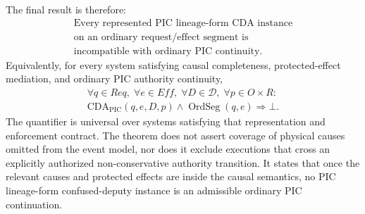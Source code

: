 \documentclass[10pt,twocolumn]{article}
\newcommand{\OrdSeg}{\operatorname{OrdSeg}}
\newcommand{\CDApic}{\mathrm{CDA}_{\mathrm{PIC}}}
\begin{document}
The final result is therefore:
\begin{equation}
\boxed{
\begin{gathered}
\text{Every represented PIC lineage-form CDA instance}\\
\text{on an ordinary request/effect segment is}\\
\text{incompatible with ordinary PIC continuity.}
\end{gathered}}
\end{equation}
Equivalently, for every system satisfying causal completeness, protected-effect
mediation, and ordinary PIC authority continuity,
\begin{equation}
\boxed{
\begin{gathered}
\forall q\in Req,\;\forall e\in Eff,\;\forall D\in\mathcal D,\;
\forall p\in O\times R:\\
\CDApic(q,e,D,p)\land\OrdSeg(q,e)\Longrightarrow\bot.
\end{gathered}}
\end{equation}
The quantifier is universal over systems satisfying that representation and
enforcement contract.  The theorem does not assert coverage of physical causes
omitted from the event model, nor does it exclude executions that cross an
explicitly authorized non-conservative authority transition.  It states that
once the relevant causes and protected effects are inside the causal semantics,
no PIC lineage-form confused-deputy instance is an admissible ordinary PIC
continuation.
\end{document}
